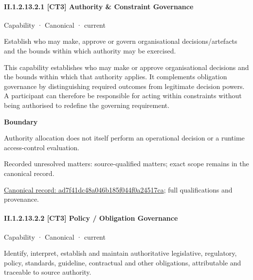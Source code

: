 \paragraph*{II.1.2.13.2.1 [CT3] Authority \& Constraint Governance}
\label{navigation:II.1.2.13.2.1}

\label{element:ad7f41dc48a046b185f044f0a24517ca}
{\small Capability · Canonical · current}\par

Establish who may make, approve or govern organisational decisions/artefacts and the bounds within which authority may be exercised.



This capability establishes who may make or approve organisational decisions and the bounds within which that authority applies. It complements obligation governance by distinguishing required outcomes from legitimate decision powers. A participant can therefore be responsible for acting within constraints without being authorised to redefine the governing requirement.



\textbf{Boundary}



Authority allocation does not itself perform an operational decision or a runtime access-control evaluation.


{\small Recorded unresolved matters: source-qualified matters; exact scope remains in the canonical record.}\par
{\footnotesize \href{../../../../continuum/strategy/capability/ad7f41dc48a046b185f044f0a24517ca.md}{Canonical record: ad7f41dc48a046b185f044f0a24517ca}; full qualifications and provenance.}\par
\paragraph*{II.1.2.13.2.2 [CT3] Policy / Obligation Governance}
\label{navigation:II.1.2.13.2.2}

\label{element:73c6e5b36bdf4bf0ad2b8b50c9b9a00b}
{\small Capability · Canonical · current}\par

Identify, interpret, establish and maintain authoritative legislative, regulatory, policy, standards, guideline, contractual and other obligations, attributable and traceable to source authority.



